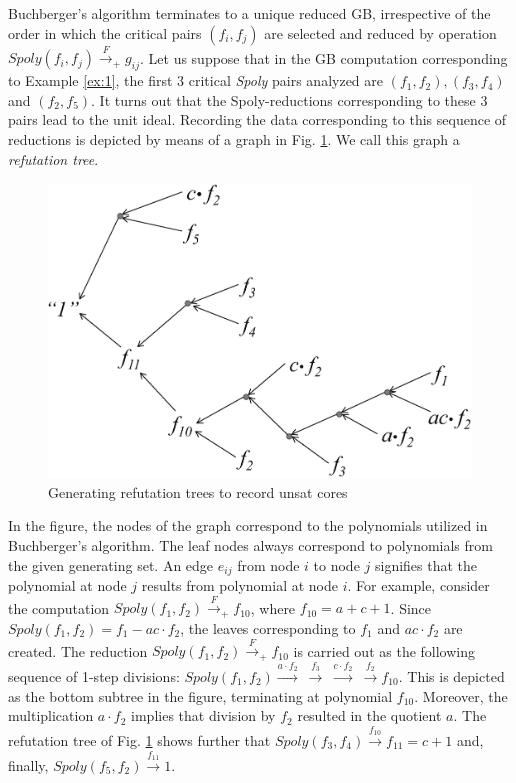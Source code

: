 Buchberger's algorithm terminates to a unique reduced GB, irrespective
of the order in which the critical pairs $(f_i,f_j)$ are selected and reduced by operation
$Spoly(f_i,f_j)\xrightarrow{F}_+g_{ij}$. Let us suppose that in the GB
computation corresponding to Example \ref{ex:1}, the first 3 critical
{\it Spoly} pairs analyzed are $(f_1, f_2), (f_3, f_4)$ and
$(f_2,f_5)$. It turns out that the Spoly-reductions corresponding to
these 3 pairs lead to the unit ideal. Recording the data
corresponding to this sequence of reductions is depicted by means of a
graph in Fig. \ref{fig:refute}. We call this graph a {\it refutation tree}. 


\begin{figure}[hbt]
\centering
\includegraphics[width=\textwidth]{newfig/refutation_tree.eps}
\caption{Generating refutation trees to record unsat cores}
\label{fig:refute}
\end{figure}

In the figure, the nodes of the graph correspond to the polynomials
utilized in Buchberger's algorithm. The leaf nodes always correspond
to polynomials from the given generating set. An edge $e_{ij}$ from
node $i$ to node $j$ signifies that the polynomial at node $j$ results
from polynomial at node $i$. For example, consider the computation
$Spoly(f_1,f_2)\xrightarrow{F}_+ f_{10}$, where $f_{10} = a + c +
1$. Since $Spoly(f_1, f_2) = f_1 - ac\cdot f_2$, the leaves
corresponding to $f_1$ and $ac\cdot f_2$ are created. The reduction
$Spoly(f_1,f_2)\xrightarrow{F}_+ f_{10}$ is carried out as the
following sequence of 1-step divisions:
$Spoly(f_1,f_2)\xrightarrow{a\cdot f_2} ~\xrightarrow{f_3}~
\xrightarrow{c\cdot f_2}  ~\xrightarrow{f_2} f_{10}$. This is depicted
as the bottom subtree in the figure, terminating at polynomial
$f_{10}$. Moreover, the multiplication $a\cdot f_2$ implies that
division by $f_2$ resulted in the quotient $a$. The refutation tree of
Fig. \ref{fig:refute} shows further that
$Spoly(f_3,f_4)\xrightarrow{f_{10}} f_{11} = c+1$ and, finally,
$Spoly(f_5,f_2)\xrightarrow{f_{11}} 1$. 
 
